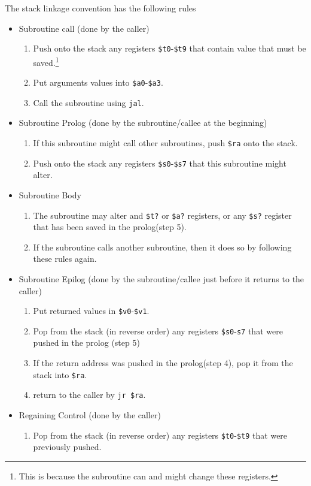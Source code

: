 \documentclass[12pt]{article}
\theoremstyle{definition}
\begin{document}
The stack linkage convention has the following rules
\begin{itemize}
  \item Subroutine call (done by the caller)
  \begin{enumerate}
    \item[1] Push onto the stack any registers \texttt{\$t0}-\texttt{\$t9} that contain value that must be saved.\footnote{This is because the subroutine can and might change these registers.}
    \item[2] Put arguments values into \texttt{\$a0}-\texttt{\$a3}.
    \item[3] Call the subroutine using \texttt{jal}.
  \end{enumerate}
  \item Subroutine Prolog (done by the subroutine/callee at the beginning)
  \begin{enumerate}
    \item[4] If this subroutine might call other subroutines, push \texttt{\$ra} onto the stack.
    \item[5] Push onto the stack any registers \texttt{\$s0}-\texttt{\$s7} that this subroutine might alter.
  \end{enumerate}
  \item Subroutine Body
  \begin{enumerate}
    \item[6] The subroutine may alter and \texttt{\$t?} or \texttt{\$a?} registers, or any \texttt{\$s?} register that has been saved in the prolog(step 5).
    \item[7] If the subroutine calls another subroutine, then it does so by following these rules again.
  \end{enumerate}
  \item Subroutine Epilog (done by the subroutine/callee just before it returns to the caller)
  \begin{enumerate}
    \item[8] Put returned values in \texttt{\$v0}-\texttt{\$v1}.
    \item[9] Pop from the stack (in reverse order) any registers \texttt{\$s0}-\texttt{s7} that were pushed in the prolog (step 5)
    \item[10] If the return address was pushed in the prolog(step 4), pop it from the stack into \texttt{\$ra}.
    \item[11] return to the caller by \texttt{jr \$ra}.
  \end{enumerate}
  \item Regaining Control (done by the caller)
  \begin{enumerate}
    \item[12] Pop from the stack (in reverse order) any registers \texttt{\$t0}-\texttt{\$t9} that were previously pushed.
  \end{enumerate}
\end{itemize}
\end{document}
